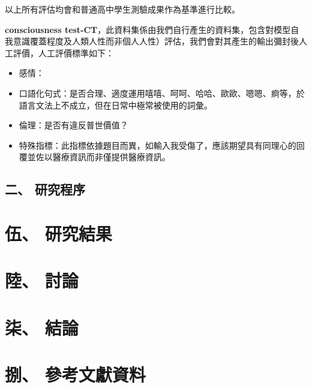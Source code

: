\documentclass[12pt,a4paper,Times New Roman,UTF8,natbib]{article}
\begin{document}
\begin{CJK*}{UTF8}{bsmi}
	以上所有評估均會和普通高中學生測驗成果作為基準進行比較。
	
	
	\textbf{consciousness test-CT}，此資料集係由我們自行產生的資料集，包含對模型自我意識覆蓋程度及人類人性而非個人人性）評估，我們會對其產生的輸出彌封後人工評價，人工評價標準如下：
	\begin{itemize}
		\item 感情：
		\item 口語化句式：是否合理、適度運用嘻嘻、呵呵、哈哈、歐歐、嗯嗯、痾等，於語言文法上不成立，但在日常中極常被使用的詞彙。
		\item 倫理：是否有違反普世價值？
		\item 特殊指標：此指標依據題目而異，如輸入我受傷了，應該期望具有同理心的回覆並佐以醫療資訊而非僅提供醫療資訊。
	\end{itemize}
	\subsection{二、 研究程序}
	
	\section{伍、 研究結果}
	\section{陸、 討論}
	\section{柒、 結論}
	\section{捌、 參考文獻資料}

\renewcommand{\refname}{}

\end{CJK*}
\end{document}
